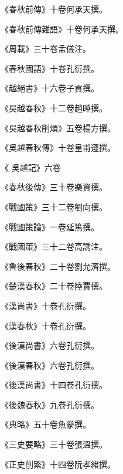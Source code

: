 \begin{pinyinscope}
 《春秋前傳》十卷何承天撰。



 《春秋前傳雜語》十卷何承天撰。



 《周載》三十卷孟儀注。



 《春秋國語》十卷孔衍撰。



 《越絕書》十六卷子貢撰。



 《吳越春秋》十二卷趙曄撰。



 《吳越春秋削煩》五卷楊方撰。



 《吳越春秋傳》十卷皇甫遵撰。



 《
 吳越記》六卷



 《春秋後傳》三十卷樂資撰。



 《戰國策》三十二卷劉向撰。



 《戰國策論》一卷延篤撰。



 《戰國策》三十二卷高誘注。



 《魯後春秋》二十卷劉允濟撰。



 《楚漢春秋》二十卷陸賈撰。



 《漢尚書》十卷孔衍撰。



 《漢春秋》十卷孔衍撰。



 《後漢尚書》六卷孔衍撰。



 《後漢春秋》六卷孔衍撰。



 《後漢尚書》十四卷孔衍撰。



 《後魏春秋》九卷孔衍撰。



 《典略》五十卷魚豢撰。



 《三史要略》三十卷張溫撰。



 《正史削繁》十四卷阮孝緒撰。




\end{pinyinscope}
